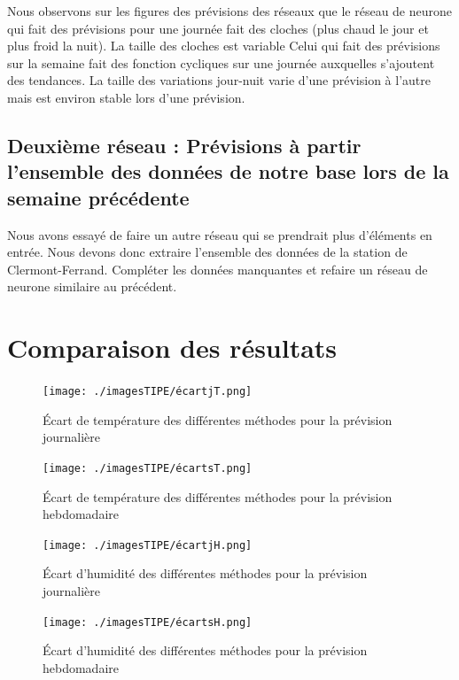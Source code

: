 \documentclass[11pt,a4paper]{article}
\begin{document}
Nous observons sur les figures des prévisions des réseaux que le réseau de neurone qui fait des prévisions pour une journée fait des cloches (plus chaud le jour et plus froid la nuit). La taille des cloches est variable
Celui qui fait des prévisions sur la semaine fait des fonction cycliques sur une journée auxquelles s'ajoutent des tendances. La taille des variations jour-nuit varie d'une prévision à l'autre mais est environ stable lors d'une prévision.

\subsection {Deuxième réseau : Prévisions à partir l'ensemble des données de notre base lors de la semaine précédente}

Nous avons essayé de faire un autre réseau qui se prendrait plus d'éléments en entrée.
Nous devons donc extraire l'ensemble des données de la station de Clermont-Ferrand. Compléter les données manquantes et refaire un réseau de neurone similaire au précédent.

\section{Comparaison des résultats}

\begin{figure} [!h]
\centering
\texttt{[image: ./imagesTIPE/écartjT.png]}\quad
\caption{\label{fig:cosDS} Écart de température des différentes méthodes pour la prévision journalière}
\end{figure}


\begin{figure} [!h]
\centering
\texttt{[image: ./imagesTIPE/écartsT.png]}\quad
\caption{\label{fig:cosDS} Écart de température des différentes méthodes pour la prévision hebdomadaire}
\end{figure}


\begin{figure} [!h]
\centering
\texttt{[image: ./imagesTIPE/écartjH.png]}\quad
\caption{\label{fig:cosDS} Écart d'humidité des différentes méthodes pour la prévision journalière}
\end{figure}


\begin{figure} [!h]
\centering
\texttt{[image: ./imagesTIPE/écartsH.png]}\quad
\caption{\label{fig:cosDS} Écart d'humidité des différentes méthodes pour la prévision hebdomadaire}
\end{figure}
\end{document}
